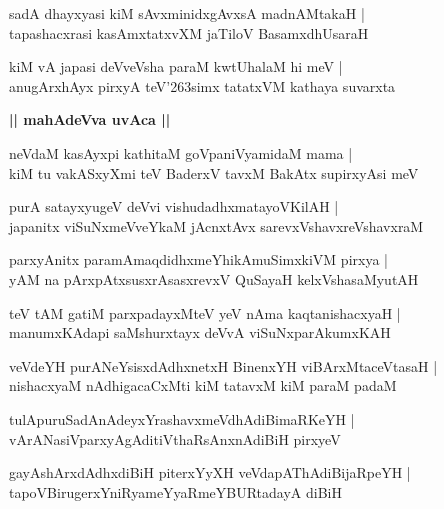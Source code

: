 \documentclass[twoside,12pt,openright]{book}
\def\S{\char'263}
\newcounter{shloka}[chapter]
\def\uvaca#1{\centerline{{\large\textbf{#1}}}}
\begin{document}
\begin{shloka}%
sadA dhayxyasi kiM sAvxminidxgAvxsA madnAMtakaH |\\
tapashacxrasi kasAmxtatxvXM jaTiloV BasamxdhUsaraH
\end{shloka}

\begin{shloka}%
kiM vA japasi deVveVsha paraM kwtUhalaM hi meV |\\
anugArxhAyx pirxyA teV\S simx tatatxVM kathaya suvarxta
\end{shloka}

\uvaca{|| mahAdeVva uvAca ||}

\begin{shloka}%
neVdaM kasAyxpi kathitaM goVpaniVyamidaM mama |\\
kiM tu vakASxyXmi teV BaderxV tavxM BakAtx supirxyAsi meV 
\end{shloka}

\begin{shloka}%
purA satayxyugeV deVvi vishudadhxmatayoVKilAH |\\
japanitx viSuNxmeVveYkaM jAcnxtAvx sarevxVshavxreVshavxraM 
\end{shloka}

\begin{shloka}%
parxyAnitx paramAmaqdidhxmeYhikAmuSimxkiVM pirxya |\\
yAM na pArxpAtxsusxrAsasxrevxV QuSayaH kelxVshasaMyutAH 
\end{shloka}

\begin{shloka}%
teV tAM gatiM parxpadayxMteV yeV nAma kaqtanishacxyaH |\\
manumxKAdapi saMshurxtayx deVvA viSuNxparAkumxKAH
\end{shloka}

\begin{shloka}%
veVdeYH purANeYsisxdAdhxnetxH BinenxYH viBArxMtaceVtasaH |\\
nishacxyaM nAdhigacaCxMti kiM tatavxM kiM paraM padaM 
\end{shloka}

\begin{shloka}%
tulApuruSadAnAdeyxYrashavxmeVdhAdiBimaRKeYH |\\
vArANasiVparxyAgAditiVthaRsAnxnAdiBiH pirxyeV
\end{shloka}

\begin{shloka}%
gayAshArxdAdhxdiBiH piterxYyXH veVdapAThAdiBijaRpeYH |\\
tapoVBirugerxYniRyameYyaRmeYBURtadayA diBiH
\end{shloka}
\end{document}

